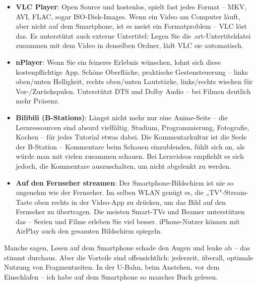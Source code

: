 \begin{itemize}
  \item \textbf{VLC Player}: Open Source und kostenlos, spielt fast jedes Format – MKV, AVI, FLAC, sogar ISO-Disk-Images. Wenn ein Video am Computer läuft, aber nicht auf dem Smartphone, ist es meist ein Formatproblem – VLC löst das. Es unterstützt auch externe Untertitel: Legen Sie die .srt-Untertiteldatei zusammen mit dem Video in denselben Ordner, lädt VLC sie automatisch.
  \item \textbf{nPlayer}: Wenn Sie ein feineres Erlebnis wünschen, lohnt sich diese kostenpflichtige App. Schöne Oberfläche, praktische Gestensteuerung – links oben/unten Helligkeit, rechts oben/unten Lautstärke, links/rechts wischen für Vor-/Zurückspulen. Unterstützt DTS und Dolby Audio – bei Filmen deutlich mehr Präsenz.
  \item \textbf{Bilibili (B-Stations)}: Längst nicht mehr nur eine Anime-Seite – die Lernressourcen sind absurd vielfältig. Studium, Programmierung, Fotografie, Kochen – für jedes Tutorial etwas dabei. Die Kommentarkultur ist die Seele der B-Station – Kommentare beim Schauen einzublenden, fühlt sich an, als würde man mit vielen zusammen schauen. Bei Lernvideos empfiehlt es sich jedoch, die Kommentare auszuschalten, um nicht abgelenkt zu werden.
  \item \textbf{Auf den Fernseher streamen}: Der Smartphone-Bildschirm ist nie so angenehm wie der Fernseher. Im selben WLAN genügt es, die „TV"-Stream-Taste oben rechts in der Video-App zu drücken, um das Bild auf den Fernseher zu übertragen. Die meisten Smart-TVs und Beamer unterstützen das – Serien und Filme erleben Sie viel besser. iPhone-Nutzer können mit AirPlay auch den gesamten Bildschirm spiegeln.
\end{itemize}


Manche sagen, Lesen auf dem Smartphone schade den Augen und lenke ab – das stimmt durchaus. Aber die Vorteile sind offensichtlich: jederzeit, überall, optimale Nutzung von Fragmentzeiten. In der U-Bahn, beim Anstehen, vor dem Einschlafen – ich habe auf dem Smartphone so manches Buch gelesen.


